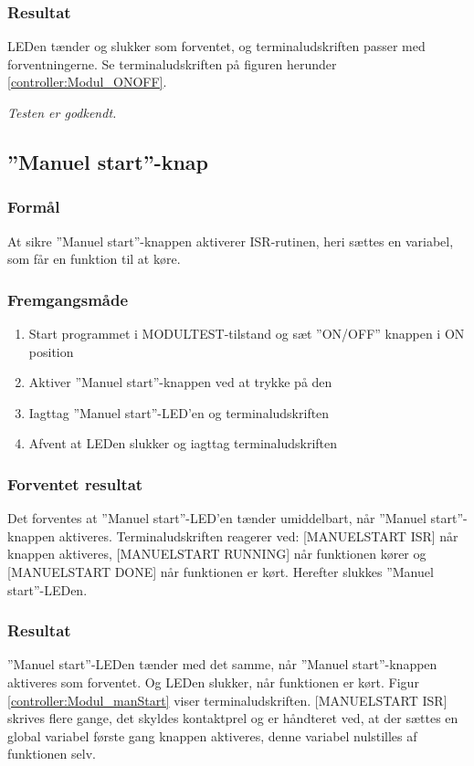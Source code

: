 \subsubsection*{Resultat} 
LEDen tænder og slukker som forventet, og terminaludskriften passer med forventningerne. Se terminaludskriften på figuren herunder \ref{controller:Modul_ONOFF}.

\textit{Testen er godkendt.}


\subsection*{''Manuel start''-knap}

\subsubsection*{Formål}
At sikre ''Manuel start''-knappen aktiverer ISR-rutinen, heri sættes en variabel, som får en funktion til at køre. 

\subsubsection*{Fremgangsmåde}
\begin{enumerate}
\item Start programmet i MODULTEST-tilstand og sæt ''ON/OFF'' knappen i ON position
\item Aktiver ''Manuel start''-knappen ved at trykke på den 
\item Iagttag ''Manuel start''-LED'en og terminaludskriften
\item Afvent at LEDen slukker og iagttag terminaludskriften 
\end{enumerate}

\subsubsection*{Forventet resultat} 
Det forventes at ''Manuel start''-LED'en tænder umiddelbart, når ''Manuel start''-knappen aktiveres. Terminaludskriften reagerer ved: [MANUELSTART ISR] når knappen aktiveres, [MANUELSTART RUNNING] når funktionen kører og [MANUELSTART DONE] når funktionen er kørt. Herefter slukkes ''Manuel start''-LEDen. 

\subsubsection*{Resultat} 
''Manuel start''-LEDen tænder med det samme, når ''Manuel start''-knappen aktiveres som forventet. Og LEDen slukker, når funktionen er kørt. Figur \ref{controller:Modul_manStart} viser terminaludskriften. [MANUELSTART ISR] skrives flere gange, det skyldes kontaktprel og er håndteret ved, at der sættes en global variabel første gang knappen aktiveres, denne variabel nulstilles af funktionen selv.

